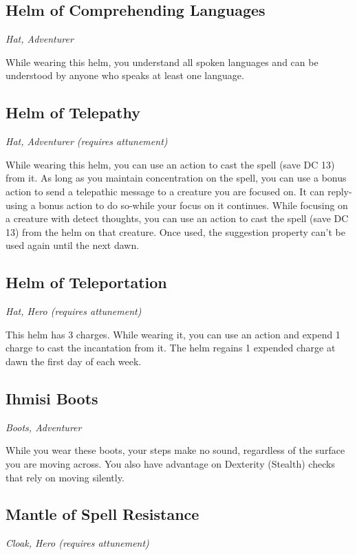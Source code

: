 \subsection{Helm of Comprehending Languages}
\textit{Hat, Adventurer}

While wearing this helm, you understand all spoken languages and can be understood by anyone who speaks at least one language.

\subsection{Helm of Telepathy}
\textit{Hat, Adventurer (requires attunement)}

While wearing this helm, you can use an action to cast the  spell (save DC 13) from it. As long as you maintain concentration on the spell, you can use a bonus action to send a telepathic message to a creature you are focused on. It can reply-using a bonus action to do so-while your focus on it continues. While focusing on a creature with detect thoughts, you can use an action to cast the  spell (save DC 13) from the helm on that creature. Once used, the suggestion property can't be used again until the next dawn.

\subsection{Helm of Teleportation}
\textit{Hat, Hero (requires attunement)}

This helm has 3 charges. While wearing it, you can use an action and expend 1 charge to cast the  incantation from it. The helm regains 1 expended charge at dawn the first day of each week.

\subsection{Ihmisi Boots}
\textit{Boots, Adventurer}

While you wear these boots, your steps make no sound, regardless of the surface you are moving across. You also have advantage on Dexterity (Stealth) checks that rely on moving silently.

\subsection{Mantle of Spell Resistance}
\textit{Cloak, Hero (requires attunement)}

